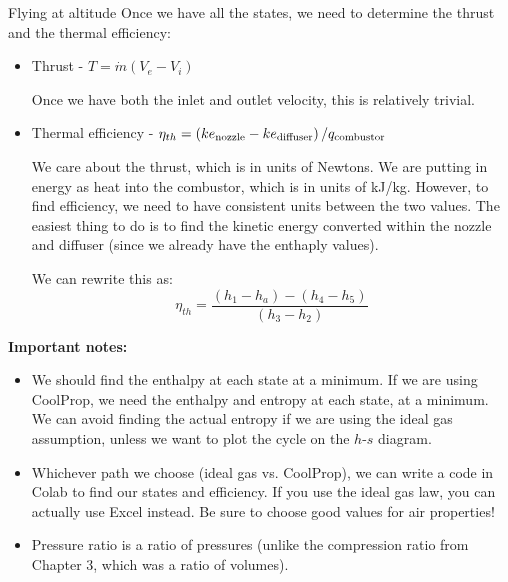 \begin{example}{Flying at altitude}
  Once we have all the states, we need to determine the thrust and the thermal efficiency:
  \begin{itemize}
  \item Thrust - $T = \dot{m}(V_e - V_i)$

    Once we have both the inlet and outlet velocity, this is relatively trivial.
    \answer{[Thrust=10.3 kN]}
  \item Thermal efficiency - $\eta_{th} = \left(ke_{\rm nozzle} - ke_{\rm diffuser}\right)/q_{\rm combustor}$

    We care about the thrust, which is in units of Newtons.  We are putting in energy as heat into the combustor, which is in units of kJ/kg. However, to find efficiency, we need to have consistent units between the two values.  The easiest thing to do is to find the kinetic energy converted within the nozzle and diffuser (since we already have the enthaply values).

    We can rewrite this as:
    \begin{equation}
      \eta_{th} = \frac{(h_1-h_a) - (h_4-h_5)}{(h_3-h_2)}
    \end{equation}
    \answer{[$\eta_{th}$ = 0.51]}
  \end{itemize}
  
  \vspace{1em}
  {\bf Important notes:}
  \begin{itemize}
  \item We should find the enthalpy at each state at a minimum.  If we are using CoolProp, we need the enthalpy and entropy at each state, at a minimum.  We can avoid finding the actual entropy if we are using the ideal gas assumption, unless we want to plot the cycle on the $h$-$s$ diagram.
  \item Whichever path we choose (ideal gas vs. CoolProp), we can write a code in Colab to find our states and efficiency.  If you use the ideal gas law, you can actually use Excel instead.  Be sure to choose good values for air properties!
  \item Pressure ratio is a ratio of pressures (unlike the compression ratio from Chapter 3, which was a ratio of volumes).
  \end{itemize}

  

  
\end{example}


